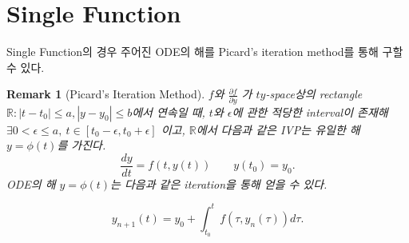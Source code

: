 \documentclass[a4paper,10pt]{article}
\newtheorem*{remark}{Remark}
\begin{document}
\section{Single Function}
Single Function의 경우 주어진 ODE의 해를 Picard's iteration method를 통해 구할 수 있다.
\begin{remark}[Picard's Iteration Method]
$f$와 $\displaystyle{\frac{\partial f}{\partial y}}$ 가 $ty$-space상의 rectangle $\mathbb{R}: |t - t_0| \leq a, |y - y_0| \leq b$에서 연속일 때, $t$와 $\epsilon$에 관한 적당한 interval이 존재해 $\exists 0 < \epsilon \leq a, \ t \in [t_0 - \epsilon, t_0 + \epsilon]$ 이고, $\mathbb{R}$에서 다음과 같은 IVP는 유일한 해 $y = \phi(t)$를 가진다.
\begin{displaymath}
    \frac{dy}{dt} = f(t, y(t)) \qquad y(t_0) = y_0.
\end{displaymath}
ODE의 해 $y = \phi(t)$는 다음과 같은 iteration을 통해 얻을 수 있다.

\begin{displaymath}
    y_{n+1}(t) = y_0 + \int_{t_0}^{t} f(\tau , y_n(\tau)) d \tau.
\end{displaymath}
\end{remark}
\end{document}
